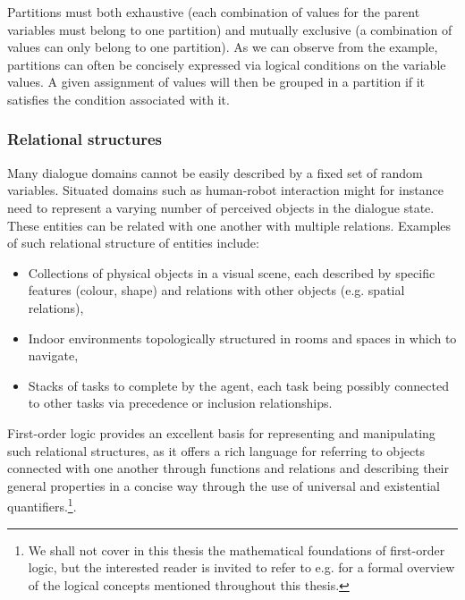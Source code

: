 Partitions must both exhaustive (each combination of values for the parent variables must belong to one partition) and mutually exclusive (a combination of values can only belong to one partition).  As we can observe from the example, partitions can often be concisely expressed via logical conditions on the variable values.  A given assignment of values will then be grouped in a partition if it satisfies the condition associated with it.

\subsubsection*{Relational structures}

Many dialogue domains cannot be easily described by a fixed set of random variables.  Situated domains such as human-robot interaction might for instance need to represent a varying number of perceived objects in the dialogue state.  These entities can be related with one another with multiple relations.  Examples of such relational structure of entities include:
\begin{itemize}
\item Collections of physical objects in a visual scene, each described by specific features (colour, shape) and relations with other objects (e.g. spatial relations),
\item Indoor environments topologically structured in rooms and spaces in which to navigate, 
\item Stacks of tasks to complete by the agent, each task being possibly connected to other tasks via precedence or inclusion relationships.
\end{itemize}

First-order logic provides an excellent basis for representing and manipulating such relational structures, as it offers a rich language for referring to objects connected with one another through functions and relations and describing their general properties in a concise way through the use of universal and existential quantifiers.\footnote{We shall not cover in this thesis the mathematical foundations of first-order logic, but the interested reader is invited to refer to e.g. \cite{gamut1991logic} for a formal overview of the logical concepts mentioned throughout this thesis.}. 

